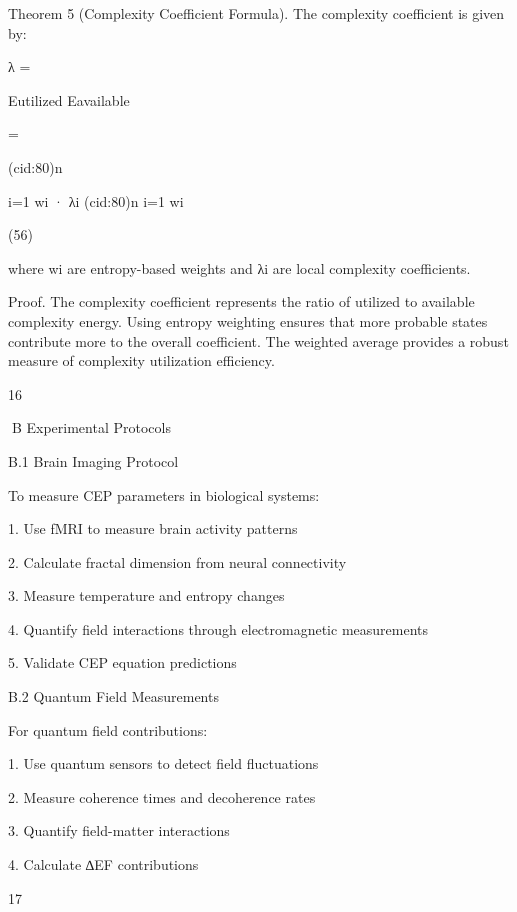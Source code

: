 Theorem 5 (Complexity Coefficient Formula). The complexity coefficient is given by:

λ =

Eutilized
Eavailable

=

(cid:80)n

i=1 wi · λi
(cid:80)n
i=1 wi

(56)

where wi are entropy-based weights and λi are local complexity coefficients.

Proof. The complexity coefficient represents the ratio of utilized to available complexity
energy. Using entropy weighting ensures that more probable states contribute more to
the overall coefficient. The weighted average provides a robust measure of complexity
utilization efficiency.

16

B Experimental Protocols

B.1 Brain Imaging Protocol

To measure CEP parameters in biological systems:

1. Use fMRI to measure brain activity patterns

2. Calculate fractal dimension from neural connectivity

3. Measure temperature and entropy changes

4. Quantify field interactions through electromagnetic measurements

5. Validate CEP equation predictions

B.2 Quantum Field Measurements

For quantum field contributions:

1. Use quantum sensors to detect field fluctuations

2. Measure coherence times and decoherence rates

3. Quantify field-matter interactions

4. Calculate ∆EF contributions

17

